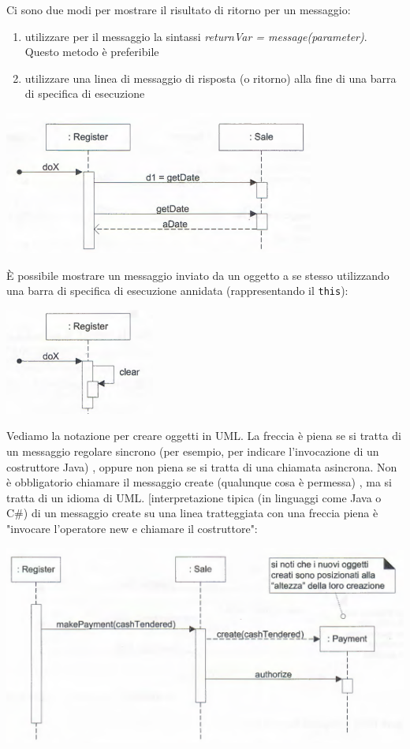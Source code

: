 \documentclass[a4paper,12pt, oneside]{book}
\begin{document}
Ci sono due modi per mostrare il risultato di ritorno per un messaggio:
\begin{enumerate}
	\item utilizzare per il messaggio la sintassi \textit{returnVar = message(parameter)}. Questo metodo è preferibile
	\item utilizzare una linea di messaggio di risposta (o ritorno) alla fine di una barra di specifica di esecuzione
\end{enumerate}
\begin{center}
	\includegraphics[scale=0.7]{img/msgd2.png}
\end{center}
\newpage
È possibile mostrare un messaggio inviato da un oggetto a se stesso utilizzando una barra di specifica di esecuzione annidata (rappresentando il \texttt{this}):
\begin{center}
	\includegraphics[scale=0.7]{img/this.png}
\end{center}
Vediamo la notazione per creare oggetti in UML. La freccia è piena se si tratta di un messaggio regolare
sincrono (per esempio, per indicare l'invocazione di un costruttore Java) , oppure non piena se si tratta di una chiamata asincrona. Non è obbligatorio chiamare il messaggio create (qualunque cosa è permessa) , ma si tratta di un idioma di UML. [interpretazione tipica (in linguaggi come Java o C\#) di un messaggio create su una linea tratteggiata con una freccia piena è "invocare l'operatore new e chiamare il costruttore":
\begin{center}
	\includegraphics[scale=0.7]{img/objd.png}
\end{center}
\end{document}
